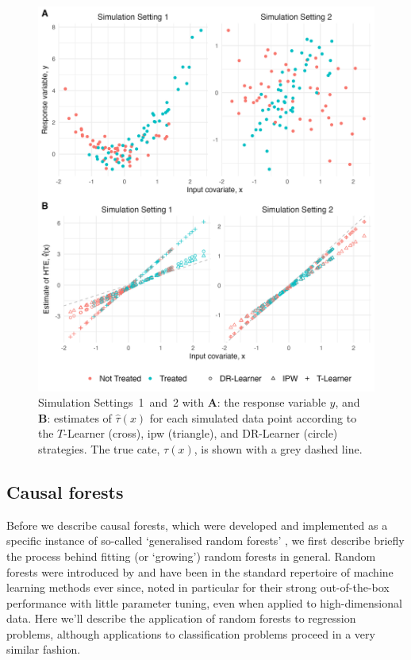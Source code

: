 \documentclass[../thesis.tex]{subfiles}
\begin{document}
\begin{figure}[!tpb] 
\centering
\includegraphics[width=\textwidth]{figures/chapter4/comp_figure_with_dr.png}
\caption{Simulation Settings~1~and~2 with \textbf{A}: the response variable $y$, and \textbf{B}: estimates of $\hat{\tau}(x)$ for each simulated data point according to the $T$-Learner (cross), \gls{ipw} (triangle), and DR-Learner (circle) strategies. The true \gls{cate}, $\tau(x)$, is shown with a grey dashed line.  \label{fig:comp_t_ipw_dr}}
\end{figure}


\subsection{Causal forests}

 Before we describe causal forests, which were developed and implemented as a specific instance of so-called `generalised random forests' \citep{athey_generalized_2019, athey_estimating_2019}, we first describe briefly the process behind fitting (or `growing') random forests in general. Random forests were introduced by \citet{breiman_random_2001} and have been in the standard repertoire of machine learning methods ever since, noted in particular for their strong out-of-the-box performance with little parameter tuning, even when applied to high-dimensional data. Here we'll describe the application of random forests to regression problems, although applications to classification problems proceed in a very similar fashion.
\end{document}
